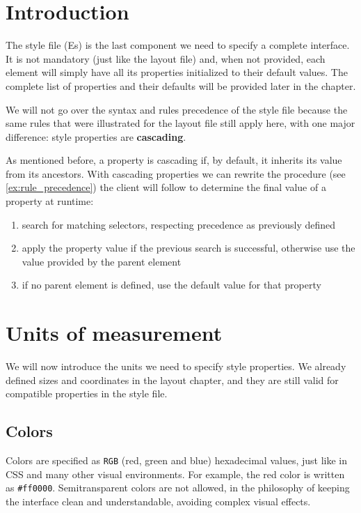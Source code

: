 
\section{Introduction}

The style file (Es) is the last component we need to specify a complete interface. It is not mandatory (just like the layout file) and, when not provided, each element will simply have all its properties initialized to their default values. The complete list of properties and their defaults will be provided later in the chapter.

We will not go over the syntax and rules precedence of the style file because the same rules that were illustrated for the layout file still apply here, with one major difference: style properties are \textbf{cascading}.

As mentioned before, a property is cascading if, by default, it inherits its value from its ancestors. With cascading properties we can rewrite the procedure (see \ref{ex:rule_precedence}) the client will follow to determine the final value of a property at runtime:

\begin{enumerate}
    \item search for matching selectors, respecting precedence as previously defined
    \item apply the property value if the previous search is successful, otherwise use the value provided by the parent element
    \item if no parent element is defined, use the default value for that property
\end{enumerate}

\section{Units of measurement}

We will now introduce the units we need to specify style properties. We already defined sizes and coordinates in the layout chapter, and they are still valid for compatible properties in the style file.

\subsection{Colors}

Colors are specified as \verb|RGB| (red, green and blue) hexadecimal values, just like in CSS and many other visual environments. For example, the red color is written as \verb|#ff0000|. Semitransparent colors are not allowed, in the philosophy of keeping the interface clean and understandable, avoiding complex visual effects.

